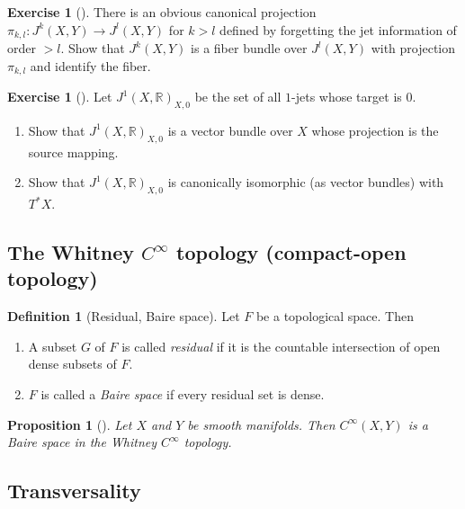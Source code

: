 \documentclass[reqno]{amsart}
\newtheorem{proposition}[theorem]{Proposition}
\theoremstyle{definition}
\newtheorem{definition}[theorem]{Definition}
\newtheorem{exercise}[theorem]{Exercise}
\theoremstyle{remark}
\begin{document}
\begin{exercise}[]
    There is an obvious canonical projection
    $\pi_{k,l} \colon J^{k}(X,Y) \to 
    J^{l}(X,Y)$ for $k > l$ defined by forgetting the
    jet information of order $>l$. Show that
    $J^{k}(X,Y)$ is a fiber bundle over
    $J^{l}(X,Y)$ with projection $\pi_{k,l}$ and identify
    the fiber.
\end{exercise}

\begin{exercise}[]
    Let $J^{1}\left( X,\mathbb{R} \right)_{X,0}$ be
    the set of all $1$-jets whose target is $0$.
    \begin{enumerate}
        \item Show that $J^{1}(X,\mathbb{R})_{X,0}$ is a vector
            bundle over $X$ whose projection is
            the source mapping.
        \item Show that $J^{1}(X,\mathbb{R})_{X,0}$ is canonically
            isomorphic (as vector bundles) with
            $T^{*}X$.
    \end{enumerate}
\end{exercise}


\subsection{The Whitney $C^{\infty}$ topology (compact-open topology)}

\begin{definition}[Residual, Baire space]
    Let $F$ be a topological space.
    Then
    \begin{enumerate}
        \item A subset $G$ of $F$ is called
            \textit{residual} if it is the countable
            intersection of open dense subsets of $F$.
        \item $F$ is called a \textit{Baire space} if
            every residual set is dense.
    \end{enumerate}
\end{definition}

\begin{proposition}[]\label{Sm-Maps-Mfds-Baire}
    Let $X$ and $Y$ be smooth manifolds. Then
    $C^{\infty}(X,Y)$ is a Baire space in the
    Whitney $C^{\infty}$ topology.
\end{proposition}

\subsection{Transversality}
\end{document}
